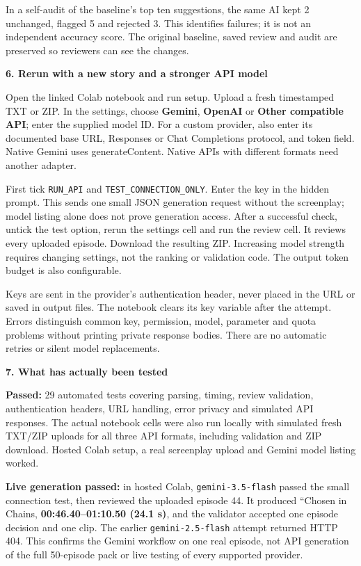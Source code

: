 \documentclass[10pt,a4paper]{article}
\newcommand{\heading}[1]{\vspace{4pt}\textbf{\large #1}\par\vspace{-2pt}}
\begin{document}
In a self-audit of the baseline's top ten suggestions, the same AI kept 2 unchanged, flagged 5 and rejected 3. This identifies failures; it is not an independent accuracy score. The original baseline, saved review and audit are preserved so reviewers can see the changes.

\heading{6. Rerun with a new story and a stronger API model}
Open the linked Colab notebook and run setup. Upload a fresh timestamped TXT or ZIP. In the settings, choose \textbf{Gemini}, \textbf{OpenAI} or \textbf{Other compatible API}; enter the supplied model ID. For a custom provider, also enter its documented base URL, Responses or Chat Completions protocol, and token field. Native Gemini uses generateContent. Native APIs with different formats need another adapter.

First tick \texttt{RUN\_API} and \texttt{TEST\_CONNECTION\_ONLY}. Enter the key in the hidden prompt. This sends one small JSON generation request without the screenplay; model listing alone does not prove generation access. After a successful check, untick the test option, rerun the settings cell and run the review cell. It reviews every uploaded episode. Download the resulting ZIP. Increasing model strength requires changing settings, not the ranking or validation code. The output token budget is also configurable.

Keys are sent in the provider's authentication header, never placed in the URL or saved in output files. The notebook clears its key variable after the attempt. Errors distinguish common key, permission, model, parameter and quota problems without printing private response bodies. There are no automatic retries or silent model replacements.

\heading{7. What has actually been tested}
\textbf{Passed:} 29 automated tests covering parsing, timing, review validation, authentication headers, URL handling, error privacy and simulated API responses. The actual notebook cells were also run locally with simulated fresh TXT/ZIP uploads for all three API formats, including validation and ZIP download. Hosted Colab setup, a real screenplay upload and Gemini model listing worked.

\textbf{Live generation passed:} in hosted Colab, \texttt{gemini-3.5-flash} passed the small connection test, then reviewed the uploaded episode 44. It produced ``Chosen in Chains, \textbf{00:46.40--01:10.50 (24.1 s)}, and the validator accepted one episode decision and one clip. The earlier \texttt{gemini-2.5-flash} attempt returned HTTP 404. This confirms the Gemini workflow on one real episode, not API generation of the full 50-episode pack or live testing of every supported provider.
\end{document}
